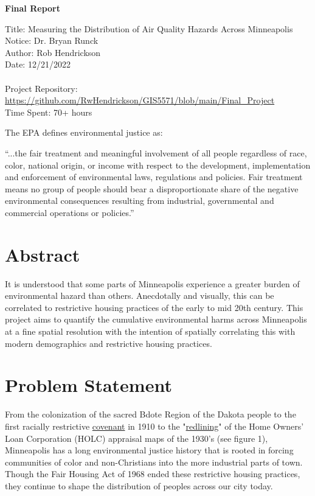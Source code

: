 \documentclass[article,12pt]{article}
\numberwithin{equation}{section}
\begin{document}
\begin{center}
\textbf{Final Report}

Title: Measuring the Distribution of Air Quality Hazards Across Minneapolis\\
Notice: Dr. Bryan Runck\\
Author: Rob Hendrickson\\
Date: 12/21/2022\\~\\

Project Repository: \url{https://github.com/RwHendrickson/GIS5571/blob/main/Final_Project}\\
Time Spent: 70+ hours

\end{center}
\vspace{1in}
The EPA defines environmental justice as: 
\begin{displayquote}
	“...the fair treatment and meaningful involvement of all people regardless of race, color, national origin, or income with respect to the development, implementation and enforcement of environmental laws, regulations and policies. Fair treatment means no group of people should bear a disproportionate share of the negative environmental consequences resulting from industrial, governmental and commercial operations or policies.” \cite{epaEJ} 
\end{displayquote}
\vspace{0.5in}
\section*{Abstract}
It is understood that some parts of Minneapolis experience a greater burden of environmental hazard than others. Anecdotally and visually, this can be correlated to restrictive housing practices of the early to mid 20th century. This project aims to quantify the cumulative environmental harms across Minneapolis at a fine spatial resolution with the intention of spatially correlating this with modern demographics and restrictive housing practices.


\section{Problem Statement}

From the colonization of the sacred Bdote Region of the Dakota people to the first racially restrictive \href{https://pressbooks.umn.edu/mappingprejudicecurriculum/chapter/what-is-a-racial-covenant/}{covenant} in 1910 to the "\href{https://legacy.umn.edu/stories/a-city-divided-0}{redlining}" of the Home Owners' Loan Corporation (HOLC) appraisal maps of the 1930's (see figure 1), Minneapolis has a long environmental justice history that is rooted in forcing communities of color and non-Christians into the more industrial parts of town. Though the Fair Housing Act of 1968 ended these restrictive housing practices, they continue to shape the distribution of peoples across our city today.
\end{document}
